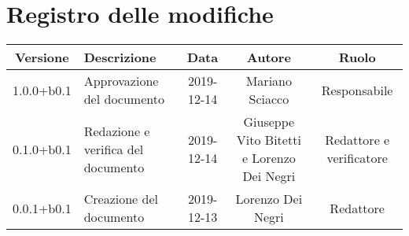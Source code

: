 \section*{Registro delle modifiche}

\begin{center}
	\begin{longtable}{|c|p{3cm}|c|c|c|}
	\hline
	\rowcolor{lighter-grayer}
	\textbf{Versione} & \textbf{Descrizione} & \textbf{Data} & \textbf{Autore} & \textbf{Ruolo} \\
	\hline
	\endfirsthead



	1.0.0+b0.1 & Approvazione del documento & 2019-12-14 & Mariano Sciacco & Responsabile \\
	\hline
	0.1.0+b0.1 & Redazione e verifica del documento & 2019-12-14 & Giuseppe Vito Bitetti e Lorenzo Dei Negri & Redattore e verificatore \\
	\hline
	0.0.1+b0.1 & Creazione del documento & 2019-12-13 & Lorenzo Dei Negri & Redattore \\
	\hline

	\end{longtable}
\end{center}
